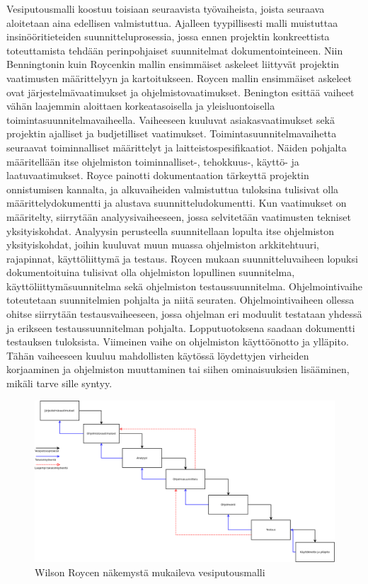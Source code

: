\documentclass[finnish,12pt]{tktltiki2}
\theoremstyle{definition}
\theoremstyle{remark}
\begin{document}
Vesiputousmalli koostuu toisiaan seuraavista työvaiheista, joista seuraava aloitetaan aina edellisen valmistuttua. Ajalleen tyypillisesti malli muistuttaa insinööritieteiden suunnitteluprosessia, jossa ennen projektin konkreettista toteuttamista tehdään perinpohjaiset suunnitelmat dokumentointeineen. Niin Benningtonin kuin Roycenkin mallin ensimmäiset askeleet liittyvät projektin vaatimusten määrittelyyn ja kartoitukseen. Roycen mallin ensimmäiset askeleet ovat järjestelmävaatimukset ja ohjelmistovaatimukset\cite{Royce1970}. Benington esittää vaiheet vähän laajemmin aloittaen korkeatasoisella ja yleisluontoisella toimintasuunnitelmavaiheella. Vaiheeseen kuuluvat asiakasvaatimukset sekä projektin ajalliset ja budjetilliset vaatimukset. Toimintasuunnitelmavaihetta seuraavat toiminnalliset määrittelyt ja laitteistospesifikaatiot. \cite{Benington:1987:PLC:41765.41799} Näiden pohjalta määritellään itse ohjelmiston toiminnalliset-, tehokkuus-, käyttö- ja laatuvaatimukset. Royce painotti dokumentaation tärkeyttä projektin onnistumisen kannalta, ja alkuvaiheiden valmistuttua tuloksina tulisivat olla määrittelydokumentti ja alustava suunnitteludokumentti. Kun vaatimukset on määritelty, siirrytään analyysivaiheeseen, jossa selvitetään vaatimusten tekniset yksityiskohdat. Analyysin perusteella suunnitellaan lopulta itse ohjelmiston yksityiskohdat, joihin kuuluvat muun muassa ohjelmiston arkkitehtuuri, rajapinnat, käyttöliittymä ja testaus. Roycen mukaan suunnitteluvaiheen lopuksi dokumentoituina tulisivat olla ohjelmiston lopullinen suunnitelma, käyttöliittymäsuunnitelma sekä ohjelmiston testaussuunnitelma. Ohjelmointivaihe toteutetaan suunnitelmien pohjalta ja niitä seuraten. Ohjelmointivaiheen ollessa ohitse siirrytään testausvaiheeseen, jossa ohjelman eri moduulit testataan yhdessä ja erikseen testaussuunnitelman pohjalta. Lopputuotoksena saadaan dokumentti testauksen tuloksista. Viimeinen vaihe on ohjelmiston käyttöönotto ja ylläpito. Tähän vaiheeseen kuuluu mahdollisten käytössä löydettyjen virheiden korjaaminen ja ohjelmiston muuttaminen tai siihen ominaisuuksien lisääminen, mikäli tarve sille syntyy.

\begin{figure}[ht!]
\centering
{}
\includegraphics[width=150mm]{Diagram1.png}
\caption{Wilson Roycen näkemystä mukaileva vesiputousmalli}
\label{overflow}
\end{figure}
\end{document}
